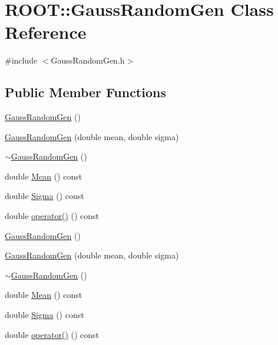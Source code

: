 \hypertarget{classROOT_1_1Minuit2_1_1GaussRandomGen}{}\section{R\+O\+OT\+:\+:Gauss\+Random\+Gen Class Reference}
\label{classROOT_1_1Minuit2_1_1GaussRandomGen}


{\ttfamily \#include $<$Gauss\+Random\+Gen.\+h$>$}

\subsection*{Public Member Functions}
\begin{DoxyCompactItemize}
\item 
\mbox{\hyperlink{classROOT_1_1Minuit2_1_1GaussRandomGen_aa69b55c52b1d75f17b63b8b221a9db15}{Gauss\+Random\+Gen}} ()
\item 
\mbox{\hyperlink{classROOT_1_1Minuit2_1_1GaussRandomGen_afda9ccd9d6e848aadc5596c27f690a10}{Gauss\+Random\+Gen}} (double mean, double sigma)
\item 
\mbox{\hyperlink{classROOT_1_1Minuit2_1_1GaussRandomGen_abcee4b223f80a68384c09bd13c922a03}{$\sim$\+Gauss\+Random\+Gen}} ()
\item 
double \mbox{\hyperlink{classROOT_1_1Minuit2_1_1GaussRandomGen_af0c44fa97654765f21d85891ef141e2d}{Mean}} () const
\item 
double \mbox{\hyperlink{classROOT_1_1Minuit2_1_1GaussRandomGen_a13d1989f3eced64b30a04788f8ed2cad}{Sigma}} () const
\item 
double \mbox{\hyperlink{classROOT_1_1Minuit2_1_1GaussRandomGen_aaefcd8e04b3388314c9f14932a17a163}{operator()}} () const
\item 
\mbox{\hyperlink{classROOT_1_1Minuit2_1_1GaussRandomGen_aa69b55c52b1d75f17b63b8b221a9db15}{Gauss\+Random\+Gen}} ()
\item 
\mbox{\hyperlink{classROOT_1_1Minuit2_1_1GaussRandomGen_afda9ccd9d6e848aadc5596c27f690a10}{Gauss\+Random\+Gen}} (double mean, double sigma)
\item 
\mbox{\hyperlink{classROOT_1_1Minuit2_1_1GaussRandomGen_abcee4b223f80a68384c09bd13c922a03}{$\sim$\+Gauss\+Random\+Gen}} ()
\item 
double \mbox{\hyperlink{classROOT_1_1Minuit2_1_1GaussRandomGen_af0c44fa97654765f21d85891ef141e2d}{Mean}} () const
\item 
double \mbox{\hyperlink{classROOT_1_1Minuit2_1_1GaussRandomGen_a13d1989f3eced64b30a04788f8ed2cad}{Sigma}} () const
\item 
double \mbox{\hyperlink{classROOT_1_1Minuit2_1_1GaussRandomGen_aaefcd8e04b3388314c9f14932a17a163}{operator()}} () const
\end{DoxyCompactItemize}


